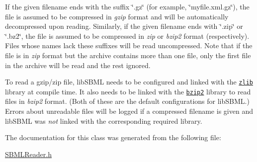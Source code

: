 \begin{DoxyParagraph}{}
If the given filename ends with the suffix {\ttfamily \char`\"{}.\+gz\char`\"{}} (for example, {\ttfamily \char`\"{}myfile.\+xml.\+gz\char`\"{}}), the file is assumed to be compressed in {\itshape gzip} format and will be automatically decompressed upon reading. Similarly, if the given filename ends with {\ttfamily \char`\"{}.\+zip\char`\"{}} or {\ttfamily \char`\"{}.\+bz2\char`\"{}}, the file is assumed to be compressed in {\itshape zip} or {\itshape bzip2} format (respectively). Files whose names lack these suffixes will be read uncompressed. Note that if the file is in {\itshape zip} format but the archive contains more than one file, only the first file in the archive will be read and the rest ignored.
\end{DoxyParagraph}
\begin{DoxyParagraph}{}
To read a gzip/zip file, lib\+S\+B\+ML needs to be configured and linked with the \href{http://www.zlib.net/}{\tt zlib} library at compile time. It also needs to be linked with the \href{}{\tt bzip2} library to read files in {\itshape bzip2} format. (Both of these are the default configurations for lib\+S\+B\+ML.) Errors about unreadable files will be logged if a compressed filename is given and lib\+S\+B\+ML was {\itshape not} linked with the corresponding required library. 
\end{DoxyParagraph}


The documentation for this class was generated from the following file\+:\begin{DoxyCompactItemize}
\item 
\hyperlink{_s_b_m_l_reader_8h}{S\+B\+M\+L\+Reader.\+h}\end{DoxyCompactItemize}
